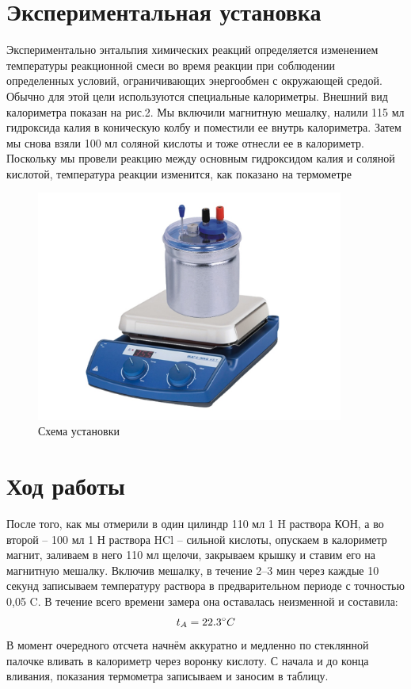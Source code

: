 \documentclass[a4paper, 12pt]{article}%
\begin{document}
\section{Экспериментальная установка}
Экспериментально энтальпия химических реакций определяется изменением температуры реакционной смеси во время реакции при соблюдении определенных условий, ограничивающих энергообмен с окружающей средой. Обычно для этой цели используются специальные калориметры. Внешний вид калориметра показан на рис.2. Мы включили магнитную мешалку, налили 115 мл гидроксида калия в коническую колбу и поместили ее внутрь калориметра. Затем мы снова взяли 100 мл соляной кислоты и тоже отнесли ее в калориметр. Поскольку мы провели реакцию между основным гидроксидом калия и соляной кислотой, температура реакции изменится, как показано на термометре
\begin{figure}
\includegraphics[width = 0.9\textwidth]{fig2.jpg}
\caption{Схема установки}
\end{figure}
\newpage{}
\section{Ход работы}
После того, как мы отмерили в один цилиндр 110 мл 1 H раствора КОН, а во второй – 100 мл 1 Н раствора HCl – сильной кислоты, опускаем в калориметр магнит, заливаем в него 110 мл щелочи, закрываем крышку и ставим его на магнитную мешалку. Включив мешалку, в течение 2–3 мин через каждые 10 секунд записываем температуру раствора в предварительном периоде с точностью 0,05 \degree C. В течение всего времени замера она оставалась неизменной и составила: 
\[t_A = 22.3 \degree C\]
В момент очередного отсчета начнём аккуратно и медленно по стеклянной палочке вливать в калориметр через воронку кислоту. С начала и до конца вливания, показания термометра записываем и заносим в таблицу.
\end{document}
